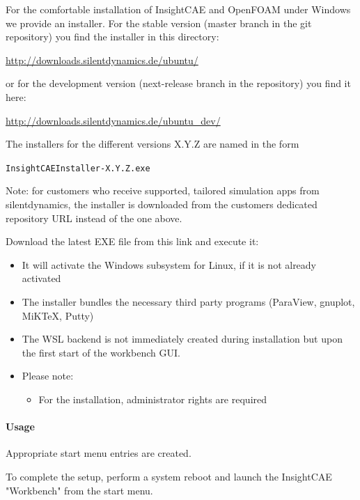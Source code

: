 For the comfortable installation of InsightCAE and OpenFOAM under Windows we provide an installer.
For the stable version (master branch in the git repository) you find the installer in this directory:

\url{http://downloads.silentdynamics.de/ubuntu/}

or for the development version (next-release branch in the repository) you find it here:

\url{http://downloads.silentdynamics.de/ubuntu_dev/}

The installers for the different versions X.Y.Z are named in the form 

\texttt{InsightCAEInstaller-X.Y.Z.exe}

Note: for customers who receive supported, tailored simulation apps from silentdynamics, the installer is downloaded from the customers dedicated repository URL instead of the one above.

Download the latest EXE file from this link and execute it:

\begin{itemize}
\item It will activate the Windows subsystem for Linux, if it is not already activated
\item The installer bundles the necessary third party programs (ParaView, gnuplot, MiKTeX, Putty)
\item The WSL backend is not immediately created during installation but upon the first start of the workbench GUI.
\item Please note:
\begin{itemize}
\item For the installation, administrator rights are required
\end{itemize}
\end{itemize}

\paragraph{Usage}

Appropriate start menu entries are created.

To complete the setup, perform a system reboot and launch the InsightCAE "Workbench" from the start menu.

